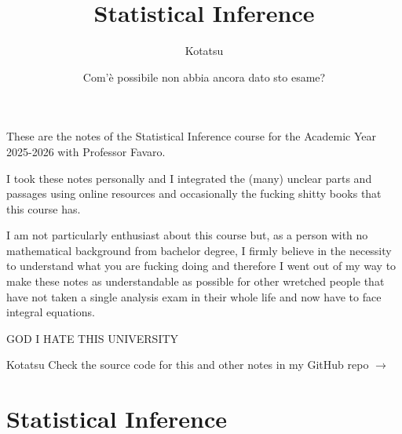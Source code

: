 \documentclass[12pt]{report}
\begin{document}
	\title{Statistical Inference}
	\author{Kotatsu}
	\date{\small Com'è possibile non abbia ancora dato sto esame?}
	\maketitle
	\begin{preface}
		These are the notes of the Statistical Inference course for the Academic Year 2025-2026 with Professor Favaro.\par
		I took these notes personally and I integrated the (many) unclear parts and passages using online resources and occasionally the fucking shitty books that this course has. \par
		I am not particularly enthusiast about this course but, as a person with no mathematical background from bachelor degree, I firmly believe in the necessity to understand what you are fucking doing and therefore I went out of my way to make these notes as understandable as possible for other wretched people that have not taken a single analysis exam in their whole life and now have to face integral equations. 
		
		GOD I HATE THIS UNIVERSITY
		\vskip1.2cm
		
		\hfill Kotatsu
		\vskip1.2cm
		Check the source code for this and other notes in my GitHub repo $\to$ \href{https://github.com/godblessourdeadkotatsu/lecture-notes-2024-25/tree/main/SI}{\faGithubSquare}
	\end{preface}
	\clearpage
	\tableofcontents
\chapter{Statistical Inference}
\end{document}
